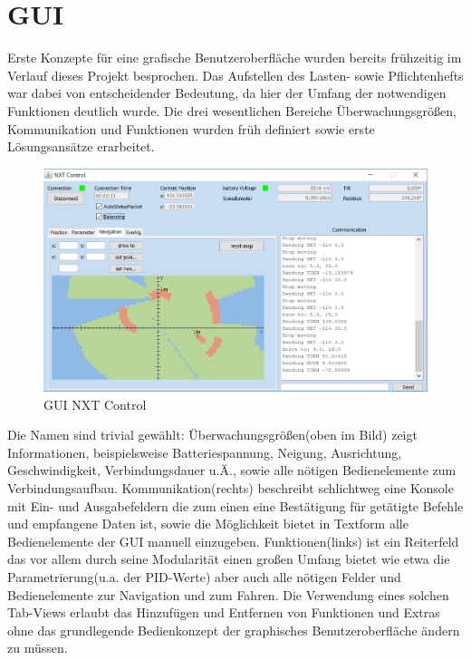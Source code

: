 \documentclass[oneside,abstractoff,a4paper]{scrartcl}
\begin{document}
\section{GUI}
\label{sec:Gui}
Erste Konzepte für eine grafische Benutzeroberfläche wurden bereits frühzeitig im Verlauf dieses Projekt besprochen. Das Aufstellen des Lasten- sowie Pflichtenhefts war dabei von entscheidender Bedeutung, da hier der Umfang der notwendigen Funktionen deutlich wurde. Die drei wesentlichen Bereiche Überwachungsgrößen, Kommunikation und Funktionen wurden früh definiert sowie erste Lösungsansätze erarbeitet.\\
\begin{figure}[!h]
	\includegraphics[width=\textwidth]{GUI_connected.jpg}
    \caption{GUI NXT Control}
    \label{fig:NXTControl}
\end{figure}
Die Namen sind trivial gewählt: \dq Überwachungsgrößen\dq(oben im Bild) zeigt Informationen, beispielsweise Batteriespannung, Neigung, Ausrichtung, Geschwindigkeit, Verbindungsdauer u.Ä., sowie alle nötigen Bedienelemente zum Verbindungsaufbau. \dq Kommunikation\dq(rechts) beschreibt schlichtweg eine Konsole mit Ein- und Ausgabefeldern die zum einen eine Bestätigung für getätigte Befehle und empfangene Daten ist, sowie die Möglichkeit bietet in Textform alle Bedienelemente der GUI manuell einzugeben. \dq Funktionen\dq(links) ist ein Reiterfeld das vor allem durch seine Modularität einen großen Umfang bietet wie etwa die Parametrierung(u.a. der PID-Werte) aber auch alle nötigen Felder und Bedienelemente zur Navigation und zum Fahren. Die Verwendung eines solchen Tab-Views erlaubt das Hinzufügen und Entfernen von Funktionen und Extras ohne das grundlegende Bedienkonzept der graphisches Benutzeroberfläche ändern zu müssen.\\
\end{document}
